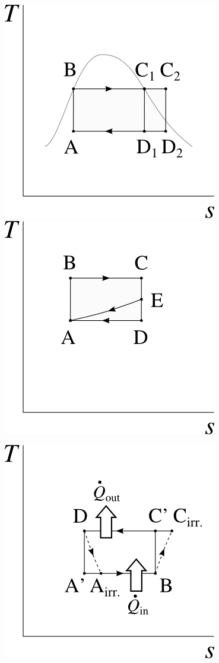 \begin{description}
{						\includegraphics[width=\solutiondiagramwidth]{images/exo_sol_ts_multiples5.png}
						\includegraphics[width=\solutiondiagramwidth]{images/exo_sol_ts_multiples6.png}
		\item [\ref{exo_ts_carnot}]
						\includegraphics[width=\solutiondiagramwidth]{images/exo_sol_ts_carnot_thermopompe.png}
}
\end{description}
